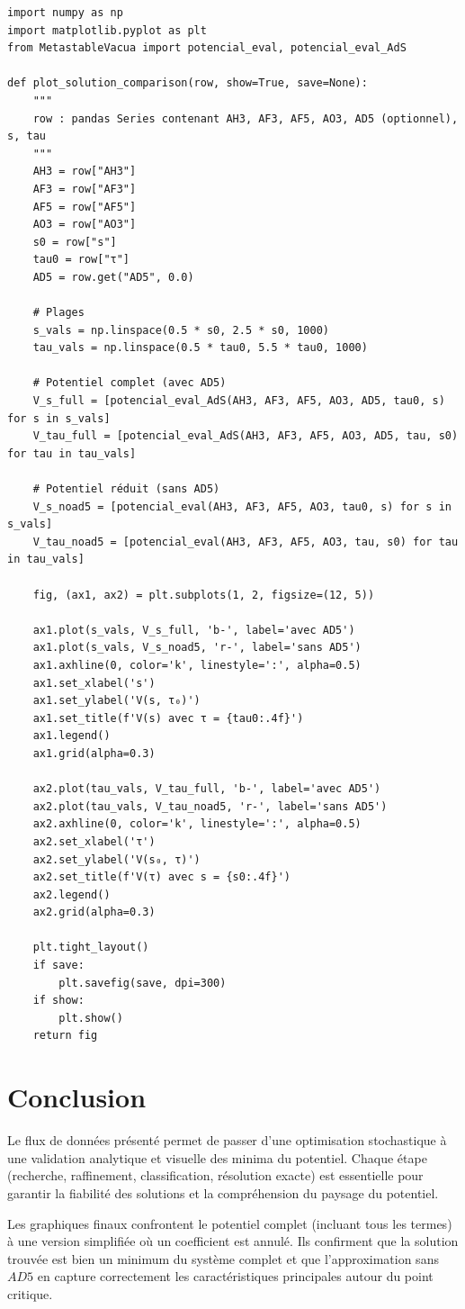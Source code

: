 \documentclass[a4paper,12pt]{article}
\begin{document}
\begin{lstlisting}[style=python, caption={Fonction de tracé pour une solution}]
import numpy as np
import matplotlib.pyplot as plt
from MetastableVacua import potencial_eval, potencial_eval_AdS

def plot_solution_comparison(row, show=True, save=None):
    """
    row : pandas Series contenant AH3, AF3, AF5, AO3, AD5 (optionnel), s, tau
    """
    AH3 = row["AH3"]
    AF3 = row["AF3"]
    AF5 = row["AF5"]
    AO3 = row["AO3"]
    s0 = row["s"]
    tau0 = row["τ"]
    AD5 = row.get("AD5", 0.0)

    # Plages
    s_vals = np.linspace(0.5 * s0, 2.5 * s0, 1000)
    tau_vals = np.linspace(0.5 * tau0, 5.5 * tau0, 1000)

    # Potentiel complet (avec AD5)
    V_s_full = [potencial_eval_AdS(AH3, AF3, AF5, AO3, AD5, tau0, s) for s in s_vals]
    V_tau_full = [potencial_eval_AdS(AH3, AF3, AF5, AO3, AD5, tau, s0) for tau in tau_vals]

    # Potentiel réduit (sans AD5)
    V_s_noad5 = [potencial_eval(AH3, AF3, AF5, AO3, tau0, s) for s in s_vals]
    V_tau_noad5 = [potencial_eval(AH3, AF3, AF5, AO3, tau, s0) for tau in tau_vals]

    fig, (ax1, ax2) = plt.subplots(1, 2, figsize=(12, 5))

    ax1.plot(s_vals, V_s_full, 'b-', label='avec AD5')
    ax1.plot(s_vals, V_s_noad5, 'r-', label='sans AD5')
    ax1.axhline(0, color='k', linestyle=':', alpha=0.5)
    ax1.set_xlabel('s')
    ax1.set_ylabel('V(s, τ₀)')
    ax1.set_title(f'V(s) avec τ = {tau0:.4f}')
    ax1.legend()
    ax1.grid(alpha=0.3)

    ax2.plot(tau_vals, V_tau_full, 'b-', label='avec AD5')
    ax2.plot(tau_vals, V_tau_noad5, 'r-', label='sans AD5')
    ax2.axhline(0, color='k', linestyle=':', alpha=0.5)
    ax2.set_xlabel('τ')
    ax2.set_ylabel('V(s₀, τ)')
    ax2.set_title(f'V(τ) avec s = {s0:.4f}')
    ax2.legend()
    ax2.grid(alpha=0.3)

    plt.tight_layout()
    if save:
        plt.savefig(save, dpi=300)
    if show:
        plt.show()
    return fig
\end{lstlisting}

\section{Conclusion}
Le flux de données présenté permet de passer d'une optimisation stochastique à une validation analytique et visuelle des minima du potentiel. Chaque étape (recherche, raffinement, classification, résolution exacte) est essentielle pour garantir la fiabilité des solutions et la compréhension du paysage du potentiel.

Les graphiques finaux confrontent le potentiel complet (incluant tous les termes) à une version simplifiée où un coefficient est annulé. Ils confirment que la solution trouvée est bien un minimum du système complet et que l'approximation sans $AD5$ en capture correctement les caractéristiques principales autour du point critique.
\end{document}
